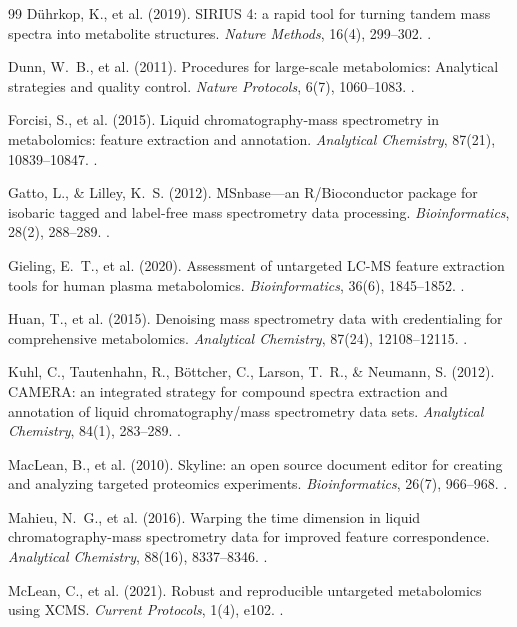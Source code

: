 \documentclass[11pt,twoside,openright]{book}
\begin{document}
\begin{thebibliography}{99}
D\"uhrkop, K., et al. (2019). SIRIUS 4: a rapid tool for turning tandem mass spectra into metabolite structures. \textit{Nature Methods}, 16(4), 299--302. .

Dunn, W.~B., et al. (2011). Procedures for large-scale metabolomics: Analytical strategies and quality control. \textit{Nature Protocols}, 6(7), 1060--1083. .

Forcisi, S., et al. (2015). Liquid chromatography-mass spectrometry in metabolomics: feature extraction and annotation. \textit{Analytical Chemistry}, 87(21), 10839--10847. .

Gatto, L., \& Lilley, K.~S. (2012). MSnbase---an R/Bioconductor package for isobaric tagged and label-free mass spectrometry data processing. \textit{Bioinformatics}, 28(2), 288--289. .

Gieling, E.~T., et al. (2020). Assessment of untargeted LC-MS feature extraction tools for human plasma metabolomics. \textit{Bioinformatics}, 36(6), 1845--1852. .

Huan, T., et al. (2015). Denoising mass spectrometry data with credentialing for comprehensive metabolomics. \textit{Analytical Chemistry}, 87(24), 12108--12115. .

Kuhl, C., Tautenhahn, R., B\"ottcher, C., Larson, T.~R., \& Neumann, S. (2012). CAMERA: an integrated strategy for compound spectra extraction and annotation of liquid chromatography/mass spectrometry data sets. \textit{Analytical Chemistry}, 84(1), 283--289. .

MacLean, B., et al. (2010). Skyline: an open source document editor for creating and analyzing targeted proteomics experiments. \textit{Bioinformatics}, 26(7), 966--968. .

Mahieu, N.~G., et al. (2016). Warping the time dimension in liquid chromatography-mass spectrometry data for improved feature correspondence. \textit{Analytical Chemistry}, 88(16), 8337--8346. .

McLean, C., et al. (2021). Robust and reproducible untargeted metabolomics using XCMS. \textit{Current Protocols}, 1(4), e102. .


\end{thebibliography}
\end{document}
